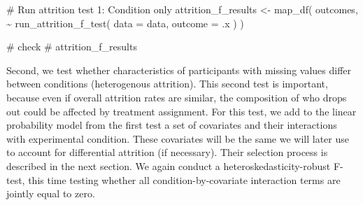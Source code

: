 \documentclass[
  letterpaper,
  DIV=11,
  numbers=noendperiod]{scrartcl}
\newenvironment{Shaded}{\begin{snugshade}}{\end{snugshade}}
\newcommand{\AttributeTok}[1]{\textcolor[rgb]{0.40,0.45,0.13}{#1}}
\newcommand{\CommentTok}[1]{\textcolor[rgb]{0.37,0.37,0.37}{#1}}
\newcommand{\FunctionTok}[1]{\textcolor[rgb]{0.28,0.35,0.67}{#1}}
\newcommand{\NormalTok}[1]{\textcolor[rgb]{0.00,0.23,0.31}{#1}}
\newcommand{\OtherTok}[1]{\textcolor[rgb]{0.00,0.23,0.31}{#1}}
\newcommand{\SpecialCharTok}[1]{\textcolor[rgb]{0.37,0.37,0.37}{#1}}
\begin{document}
\begin{Shaded}
\begin{Highlighting}[]
\CommentTok{\# Run attrition test 1: Condition only}
\NormalTok{attrition\_f\_results }\OtherTok{\textless{}{-}} \FunctionTok{map\_df}\NormalTok{(}
\NormalTok{  outcomes,}
  \SpecialCharTok{\textasciitilde{}} \FunctionTok{run\_attrition\_f\_test}\NormalTok{(}
    \AttributeTok{data =}\NormalTok{ data,}
    \AttributeTok{outcome =}\NormalTok{ .x}
\NormalTok{  )}
\NormalTok{)}

\CommentTok{\# check}
\CommentTok{\# attrition\_f\_results}
\end{Highlighting}
\end{Shaded}

Second, we test whether characteristics of participants with missing
values differ between conditions (heterogenous attrition). This second
test is important, because even if overall attrition rates are similar,
the composition of who drops out could be affected by treatment
assignment. For this test, we add to the linear probability model from
the first test a set of covariates and their interactions with
experimental condition. These covariates will be the same we will later
use to account for differential attrition (if necessary). Their
selection process is described in the next section. We again conduct a
heteroskedasticity-robust F-test, this time testing whether all
condition-by-covariate interaction terms are jointly equal to zero.
\end{document}
